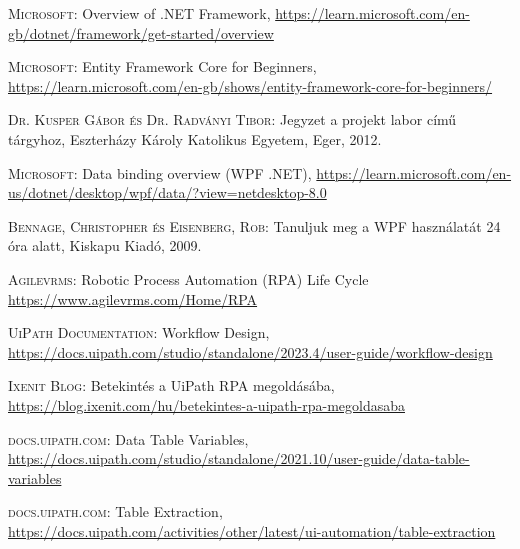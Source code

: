 \documentclass[
]{thesis-ekf}
\theoremstyle{definition}
\theoremstyle{remark}
\begin{document}
\begin{thebibliography}{2}
\textsc{Microsoft}: Overview of .NET Framework, 
\url{https://learn.microsoft.com/en-gb/dotnet/framework/get-started/overview}

\textsc{Microsoft}: Entity Framework Core for Beginners, 
\url{https://learn.microsoft.com/en-gb/shows/entity-framework-core-for-beginners/}

\textsc{Dr. Kusper Gábor és Dr. Radványi Tibor}: Jegyzet a projekt labor című tárgyhoz, Eszterházy Károly Katolikus Egyetem, Eger, 2012.

\textsc{Microsoft}: Data binding overview (WPF .NET), 
\url{https://learn.microsoft.com/en-us/dotnet/desktop/wpf/data/?view=netdesktop-8.0}

\textsc{Bennage, Christopher és Eisenberg, Rob}: Tanuljuk meg a WPF használatát 24 óra alatt, Kiskapu Kiadó, 2009.

\textsc{Agilevrms}: Robotic Process Automation (RPA) Life Cycle
\url{https://www.agilevrms.com/Home/RPA}

\textsc{UiPath Documentation}: Workflow Design, 
\url{https://docs.uipath.com/studio/standalone/2023.4/user-guide/workflow-design}

\textsc{Ixenit Blog}: Betekintés a UiPath RPA megoldásába, 
\url{https://blog.ixenit.com/hu/betekintes-a-uipath-rpa-megoldasaba}

\textsc{docs.uipath.com}: Data Table Variables, 
\url{https://docs.uipath.com/studio/standalone/2021.10/user-guide/data-table-variables}

\textsc{docs.uipath.com}: Table Extraction, 
\url{https://docs.uipath.com/activities/other/latest/ui-automation/table-extraction}
\end{thebibliography}


\end{document}
